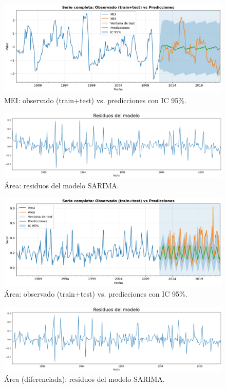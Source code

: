 \begin{figure}[H]\centering
\includegraphics[scale=.42]{Figures/pred_mei.png}
\caption{MEI: observado (train+test) vs. predicciones con IC 95\%.}
\label{fig:pred_mei}
\end{figure}

\begin{figure}[H]\centering
\includegraphics[scale=.30]{Figures/res_sarima_area.png}
\caption{Área: residuos del modelo SARIMA.}
\label{fig:res_area}
\end{figure}

\begin{figure}[H]\centering
\includegraphics[scale=.42]{Figures/pred_area.png}
\caption{Área: observado (train+test) vs. predicciones con IC 95\%.}
\label{fig:pred_area}
\end{figure}


\begin{figure}[H]\centering
\includegraphics[scale=.30]{Figures/res_sarima_area_d.png}
\caption{Área (diferenciada): residuos del modelo SARIMA.}
\label{fig:res_area_d}
\end{figure}


